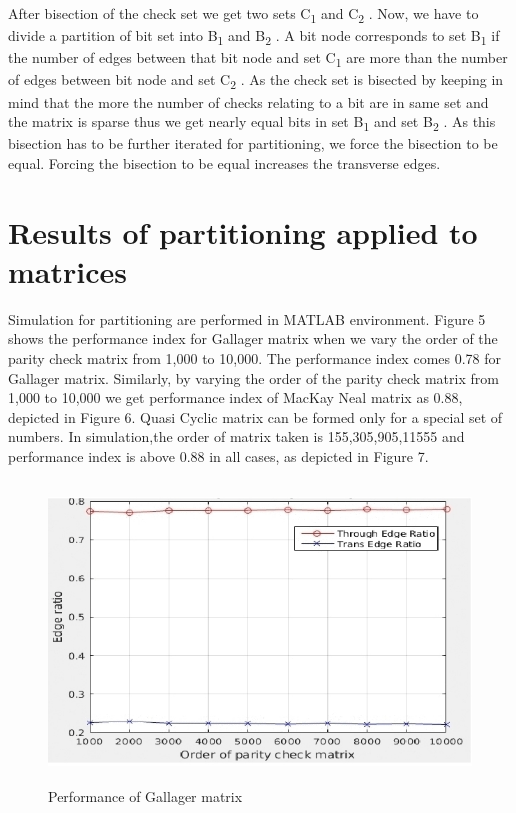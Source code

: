 \documentclass[twopage,12pt,a4paper]{report}
\begin{document}
\begin{raggedright}
\begin{itemize}
After bisection of the check set we get two sets C\textsubscript{1} and C\textsubscript{2} .
Now, we have to divide a partition of bit set into B\textsubscript{1} and B\textsubscript{2} . A
bit node corresponds to set B\textsubscript{1} if the number of edges between
that bit node and set C\textsubscript{1} are more than the number of edges
between bit node and set C\textsubscript{2} . As the check set is bisected by
keeping in mind that the more the number of checks relating
to a bit are in same set and the matrix is sparse thus we get
nearly equal bits in set B\textsubscript{1} and set B\textsubscript{2} . As this bisection has
to be further iterated for partitioning, we force the bisection
to be equal. Forcing the bisection to be equal increases the
transverse edges.


\end{itemize}

\section{Results of partitioning applied to matrices}
Simulation for partitioning are performed in MATLAB environment. Figure 5 shows the performance index for Gallager matrix when we vary the order of the parity check matrix from 1,000 to 10,000. The performance index comes 0.78 for Gallager matrix. Similarly, by varying the order of the parity check matrix from 1,000 to 10,000 we get performance index of MacKay Neal matrix as 0.88, depicted in Figure 6. Quasi Cyclic matrix can be formed only for a special set of numbers. In simulation,the order of matrix taken is 155,305,905,11555
and performance index is above 0.88 in all cases, as depicted in Figure 7.

 \begin{figure}[h]
 \begin{center}
    \includegraphics[height=8cm,width=12cm]{gallager_part.jpg}
    \caption{Performance of Gallager matrix} 
 \end{center}
\end{figure}   
 

\end{raggedright}
\end{document}
